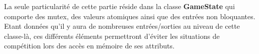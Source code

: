 \documentclass[12pt]{article}
\let\simplesection\section
\renewcommand{\section}{\clearpage\simplesection}
\begin{document}
				La seule particularité de cette partie réside dans la classe \textbf{GameState} qui comporte des \gls{mutex}, des valeurs atomiques ainsi que des entrées non bloquantes.
				Etant données qu'il y aura de nombreuses entrées/sorties au niveau de cette classe-là, ces différents éléments permettront d'éviter les situations de compétition lors des accès en mémoire de ses attributs.
				

	\printnoidxglossary[title=Index, style=indexNoDescription]
\end{document}
